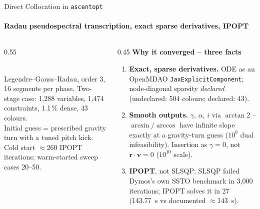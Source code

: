 \documentclass[aspectratio=169,10pt]{beamer}
\begin{document}
\begin{frame}{Direct Collocation in \texttt{ascentopt}}
  \framesubtitle{Radau pseudospectral transcription, exact sparse derivatives, IPOPT}
  \begin{columns}[T]
    \begin{column}{0.55\textwidth}
      \\[2pt]
      {\footnotesize Legendre--Gauss--Radau, order 3, 16 segments per phase. Two-stage case: 1,288 variables, 1,474 constraints, 1.1\,\% dense, 43 colours.\\[2pt] Initial guess = prescribed gravity turn with a tuned pitch kick. Cold start $\approx$260 IPOPT iterations; warm-started sweep cases 20--50.}
    \end{column}
    \begin{column}{0.45\textwidth}
      \textbf{Why it converged -- three facts}
      \small
      \begin{enumerate}\setlength{\itemsep}{2pt}
        \item \textbf{Exact, sparse derivatives.} ODE as an OpenMDAO \texttt{JaxExplicitComponent}; node-diagonal sparsity \emph{declared} (undeclared: 504 colours; declared: 43).
        \item \textbf{Smooth outputs.} $\gamma$, $\alpha$, $i$ via $\arctan2$ -- $\arcsin/\arccos$ have infinite slope exactly at a gravity-turn guess ($10^9$ dual infeasibility). Insertion as $\gamma=0$, not $\bm r\cdot\bm v=0$ ($10^{10}$ scale).
        \item \textbf{IPOPT}, not SLSQP: SLSQP failed Dymos's own SSTO benchmark in 3,000 iterations; IPOPT solves it in 27 (\SI{143.77}{s} vs documented $\approx$\SI{143}{s}).
      \end{enumerate}
    \end{column}
  \end{columns}
\end{frame}
\end{document}
